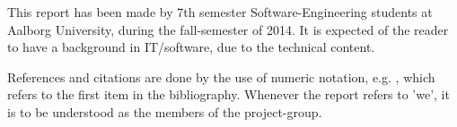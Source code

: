 This report has been made by 7th semester Software-Engineering students at Aalborg University, during the fall-semester of 2014.
It is expected of the reader to have a background in IT/software, due to the technical content.

References and citations are done by the use of numeric notation, e.g. \cite{aalborgbycyklenbagcyklen}, which refers to the first item in the bibliography.
Whenever the report refers to 'we', it is to be understood as the members of the project-group.